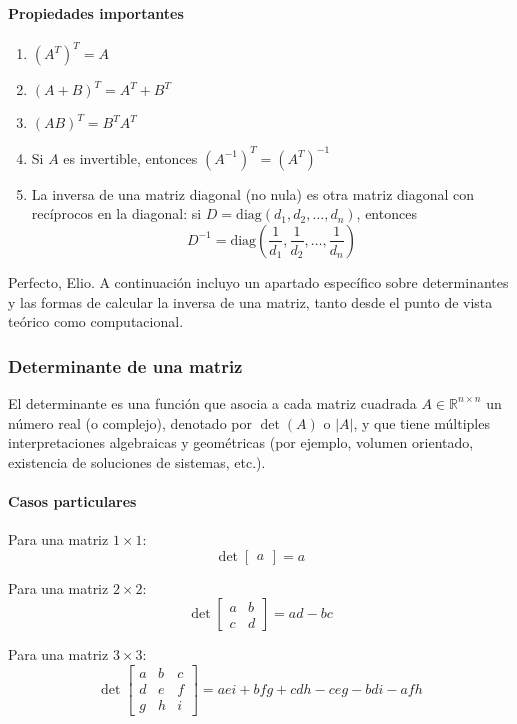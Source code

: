 \paragraph{Propiedades importantes}
\begin{enumerate}
    \item \((A^T)^T = A\)
    \item \((A + B)^T = A^T + B^T\)
    \item \((AB)^T = B^T A^T\)
    \item Si \(A\) es invertible, entonces \((A^{-1})^T = (A^T)^{-1}\)
    \item La inversa de una matriz diagonal (no nula) es otra matriz diagonal con recíprocos en la diagonal: si \(D = \text{diag}(d_1, d_2, \dots, d_n)\), entonces
    \[
    D^{-1} = \text{diag}\left(\frac{1}{d_1}, \frac{1}{d_2}, \dots, \frac{1}{d_n}\right)
    \]
\end{enumerate}

Perfecto, Elio. A continuación incluyo un apartado específico sobre determinantes y las formas de calcular la inversa de una matriz, tanto desde el punto de vista teórico como computacional.

\subsubsection{Determinante de una matriz}

El determinante es una función que asocia a cada matriz cuadrada \(A \in \mathbb{R}^{n \times n}\) un número real (o complejo), denotado por \(\det(A)\) o \(|A|\), y que tiene múltiples interpretaciones algebraicas y geométricas (por ejemplo, volumen orientado, existencia de soluciones de sistemas, etc.).

\paragraph{Casos particulares}

Para una matriz \(1 \times 1\):
\[
\det\begin{bmatrix} a \end{bmatrix} = a
\]

Para una matriz \(2 \times 2\):
\[
\det\begin{bmatrix}
a & b \\
c & d
\end{bmatrix} = ad - bc
\]

Para una matriz \(3 \times 3\):
\[
\det\begin{bmatrix}
a & b & c \\
d & e & f \\
g & h & i
\end{bmatrix} = aei + bfg + cdh - ceg - bdi - afh
\]

